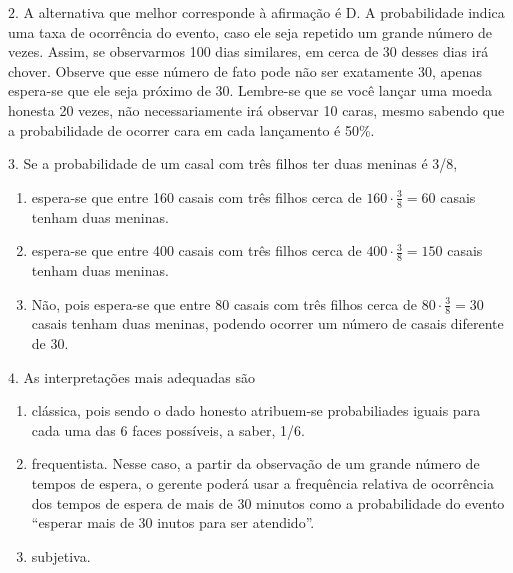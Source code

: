 \(2.\) A alternativa que melhor corresponde à afirmação é D. A probabilidade indica uma taxa de ocorrência do evento, caso ele seja repetido um grande número de vezes. Assim, se observarmos 100 dias similares, em cerca de 30 desses dias irá chover. Observe que esse número de fato pode não ser exatamente 30, apenas espera-se que ele seja próximo de 30. Lembre-se que se você lançar uma moeda honesta 20 vezes, não necessariamente irá observar 10 caras, mesmo sabendo que a probabilidade de ocorrer cara em cada lançamento é 50\%.

\(3.\) Se a probabilidade de um casal com três filhos ter duas meninas é 3/8,
\begin{enumerate}
\item {} 
espera-se que entre 160 casais com três filhos cerca de \(160\cdot \frac{3}{8}=60\) casais tenham duas meninas.

\item {} 
espera-se que entre 400 casais com três filhos cerca de \(400\cdot \frac{3}{8}=150\) casais tenham duas meninas.

\item {} 
Não, pois espera-se que entre 80 casais com três filhos cerca de \(80\cdot \frac{3}{8}=30\) casais tenham duas meninas, podendo ocorrer um número de casais diferente de 30.

\end{enumerate}

\(4.\) As interpretações mais adequadas são
\begin{enumerate}
\item {} 
clássica, pois sendo o dado honesto atribuem-se probabiliades iguais para cada uma das 6 faces possíveis, a saber, 1/6.

\item {} 
frequentista. Nesse caso, a partir da observação de um grande número de tempos de espera, o gerente poderá usar a frequência relativa de ocorrência dos tempos de espera de mais de 30 minutos como a probabilidade do evento “esperar mais de 30 inutos para ser atendido”.

\item {} 
subjetiva.

\end{enumerate}

